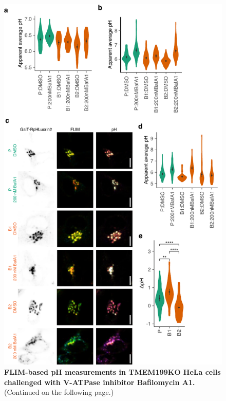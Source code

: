 \begin{figure}
    \includegraphics[keepaspectratio=true,width=\textwidth,height=\textheight]{chapters/chapter4/chapter4_SupplementaryFigure5.pdf}
    \caption{\textbf{FLIM-based pH measurements in TMEM199KO HeLa cells challenged with V-ATPase inhibitor Bafilomycin A1.} (Continued on the following page.)}
    \label{fig:ch4supfig5}
\end{figure}

